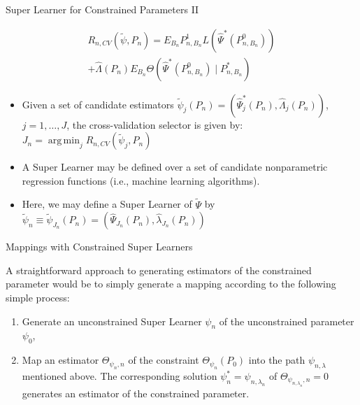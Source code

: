 \documentclass[12pt,t,handout]{beamer}
\DeclareMathOperator*{\argmin}{arg\,min}
\begin{document}

\begin{frame}[c]{Super Learner for Constrained Parameters II}

\begin{center}
\begin{equation}
\begin{split}
  R_{n, CV}(\tilde{\psi}, P_n) = E_{B_n}P_{n, B_n}^1L(\hat{\Psi}^*(P_{n,
    B_n}^0)) \\ + \hat{\Lambda}(P_n) E_{B_n} \Theta(\hat{\Psi}^*(P_{n, B_n}^0)
    \mid P_{n, B_n}^*)
\end{split}
\end{equation}
\begin{itemize}
  \itemsep12pt
  \item Given a set of candidate estimators $\widetilde{\psi}_j(P_n) =
    (\hat{\Psi}_j^*(P_n), \hat{\Lambda}_j(P_n))$, $j = 1, \ldots, J$, the
    cross-validation selector is given by: $J_n = \argmin_j R_{n,
      CV}(\widetilde{\psi}_j, P_n)$
  \item A Super Learner may be defined over a set of candidate nonparametric
    regression functions (i.e., machine learning algorithms).
  \item Here, we may define a Super Learner of $\widetilde{\Psi}$ by
    $\widetilde{\psi}_n \equiv \widetilde{\psi}_{J_n}(P_n) =
    (\hat{\Psi}_{J_n}(P_n), \hat{\lambda}_{J_n}(P_n))$
\end{itemize}
\end{center}

\note{
}

\end{frame}


\begin{frame}[c]{Mappings with Constrained Super Learners}

\begin{center}
A straightforward approach to generating estimators of the constrained parameter
would be to simply generate a mapping according to the following simple process:

\vspace*{1em}

\begin{enumerate}
  \itemsep12pt
  \item Generate an unconstrained Super Learner $\psi_n$ of the unconstrained
    parameter $\psi_0$,
  \item Map an estimator $\Theta_{\psi_n, n}$ of the constraint
    $\Theta_{\psi_n}(P_0)$ into the path $\psi_{n, \lambda}$ mentioned above.
    The corresponding solution $\psi_n^* = \psi_{n, \lambda_n}$ of
    $\Theta_{\psi_{n, \lambda_n}, n}= 0$ generates an estimator of the
    constrained parameter.
\end{enumerate}
\end{center}

\note{
}

\end{frame}
\end{document}
